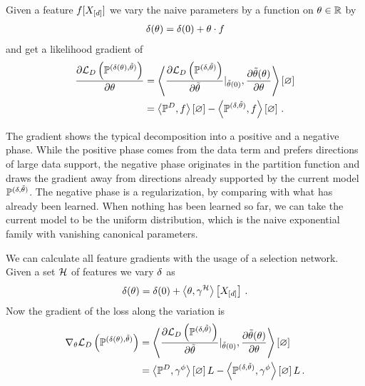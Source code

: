 Given a feature $f[X_{[d]}]$ we vary the naive parameters by a function on $\theta\in\mathbb{R}$ by
\begin{align*}
	 \naivestat(\canparam) %
	= \naivestat(0) + \canparam\cdot\exfunction
\end{align*}
and get a likelihood gradient of
\begin{align*}
	 \frac{\partial \mathcal{L}_{D}\left(\mathbb{P}^{(\delta(\theta), \tilde{\theta})}\right)}{\partial\theta} 
	 &= \left\langle 
	 	\frac{\partial\mathcal{L}_{D}\left(\mathbb{P}^{(\delta, \tilde{\theta})}\right)}{\partial\tilde{\theta}}|_{\tilde{\theta}(0)},
		\frac{\partial\tilde{\theta}(\theta)}{\partial\theta} 
	 \right\rangle \left[ \varnothing \right]  \\
	 &= \left\langle \mathbb{P}^{D},f\right\rangle \left[ \varnothing \right] -   \left\langle \mathbb{P}^{(\delta, \tilde{\theta})},f\right\rangle \left[ \varnothing \right] \, .
\end{align*}


The gradient shows the typical decomposition into a positive and a negative phase.
While the positive phase comes from the data term and prefers directions of large data support, the negative phase originates in the partition function and draws the gradient away from directions already supported by the current model $\mathbb{P}^{(\delta, \tilde{\theta})}$.
The negative phase is a regularization, by comparing with what has already been learned.
When nothing has been learned so far, we can take the current model to be the uniform distribution, which is the naive exponential family with vanishing canonical parameters. 



We can calculate all feature gradients with the usage of a selection network.
Given a set $\mathcal{H}$ of features we vary $\delta$ as
\begin{align*}
	 \naivestat(\canparam) %
	= \naivestat(0) + \sbcontractionof{\canparam,\sencodingof{\fselectionmap}}{\shortcatvariables} \, . 
\end{align*}
Now the gradient of the loss along the variation is
\begin{align*}
	 \nabla_{\theta} \mathcal{L}_{D}\left(\mathbb{P}^{(\delta(\theta), \tilde{\theta})}\right)
	 &= \left\langle 
	 	\frac{\partial\mathcal{L}_{D}\left(\mathbb{P}^{(\delta, \tilde{\theta})}\right)}{\partial\tilde{\theta}}|_{\tilde{\theta}(0)},
		\frac{\partial\tilde{\theta}(\theta)}{\partial\theta} 
	 \right\rangle \left[ \varnothing \right]  \\
	 &= \left\langle \mathbb{P}^{D},\gamma^{\phi}\right\rangle \left[ \varnothing \right]{L} -   \left\langle \mathbb{P}^{(\delta, \tilde{\theta})},\gamma^{\phi}\right\rangle \left[ \varnothing \right]{L} \, . 
\end{align*}




